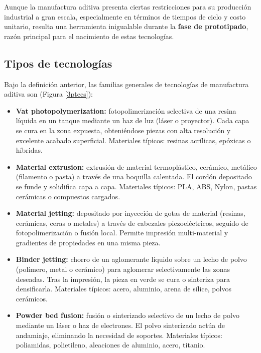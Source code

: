 Aunque la manufactura aditiva presenta ciertas restricciones para su producción industrial a gran escala, especialmente en términos de tiempos de ciclo y costo unitario, resulta una herramienta inigualable durante la \textbf{fase de prototipado}, razón principal para el nacimiento de estas tecnologías.

\subsection{Tipos de tecnologías}

Bajo la definición anterior, las familias generales de tecnologías de manufactura aditiva son (Figura \ref{3ptecs}):

\begin{itemize}
  \item \textbf{Vat photopolymerization:}  
    fotopolimerización selectiva de una resina líquida en un tanque mediante un haz de luz (láser o proyector). Cada capa se cura en la zona expuesta, obteniéndose piezas con alta resolución y excelente acabado superficial. Materiales típicos: resinas acrílicas, epóxicas o híbridas.

  \item \textbf{Material extrusion:}  
    extrusión de material termoplástico, cerámico, metálico (filamento o pasta) a través de una boquilla calentada. El cordón depositado se funde y solidifica capa a capa. Materiales típicos: PLA, ABS, Nylon, pastas cerámicas o compuestos cargados.

  \item \textbf{Material jetting:}  
    depositado por inyección de gotas de material (resinas, cerámicas, ceras o metales) a través de cabezales piezoeléctricos, seguido de fotopolimerización o fusión local. Permite impresión multi-material y gradientes de propiedades en una misma pieza.

  \item \textbf{Binder jetting:}  
    chorro de un aglomerante líquido sobre un lecho de polvo (polímero, metal o cerámico) para aglomerar selectivamente las zonas deseadas. Tras la impresión, la pieza en verde se cura o sinteriza para densificarla. Materiales típicos: acero, aluminio, arena de sílice, polvos cerámicos.

  \item \textbf{Powder bed fusion:}  
    fusión o sinterizado selectivo de un lecho de polvo mediante un láser o haz de electrones. El polvo sinterizado actúa de andamiaje, eliminando la necesidad de soportes. Materiales típicos: poliamidas, polietileno, aleaciones de aluminio, acero, titanio.


\end{itemize}
